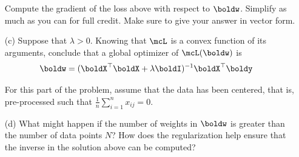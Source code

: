 \documentclass[submit]{harvardml}
\begin{document}
\begin{problem}
\begin{itemize}
Compute the gradient of the loss above with respect to $\boldw$.
Simplify as much as you can for full credit.  Make sure to give your
answer in vector form.

\item[(c)] Suppose that $\lambda > 0$. Knowing that $\mcL$ is a convex function
    of its arguments, conclude that a global optimizer of
    $\mcL(\boldw)$ is
    \begin{align}
      \boldw &= (\boldX^\top \boldX + \lambda \boldI)^{-1} \boldX^\top \boldy
    \end{align}

For this part of the problem, assume that the data has been centered,
that is, pre-processed such that $\frac{1}{n} \sum_{i=1}^n x_{ij} = 0
$.

\item[(d)] What might happen if the number of weights in $\boldw$ is
  greater than the number of data points $N$?  How does the
  regularization help ensure that the inverse in the solution above
  can be computed?  

\end{itemize}

\end{problem}
\end{document}
